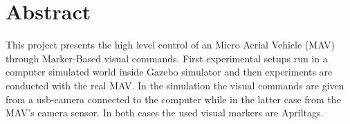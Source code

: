 \chapter*{Abstract}


This project presents the high level control of an Micro Aerial Vehicle (MAV) through Marker-Based visual commands. First experimental setups run in a computer simulated world inside Gazebo simulator\cite{GazeboSimulator} and then experiments are conducted with the real MAV. In the simulation the visual commands are given from a usb-camera connected to the computer while in the latter case from the MAV's camera sensor. In both cases the used visual markers are Apriltags\cite{olson2011tags}. 